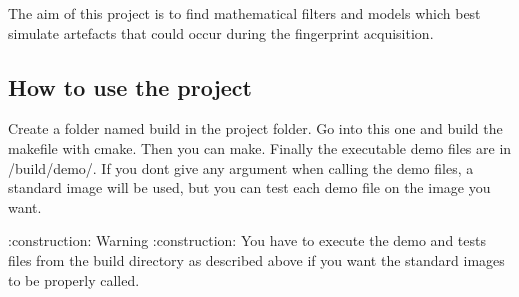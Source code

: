 The aim of this project is to find mathematical filters and models which best simulate artefacts that could occur during the fingerprint acquisition. \subsection*{How to use the project}

Create a folder named build in the project folder. Go into this one and build the makefile with cmake. Then you can make. Finally the executable demo files are in /build/demo/. If you don\textquotesingle{}t give any argument when calling the demo files, a standard image will be used, but you can test each demo file on the image you want.


 \+:construction\+: Warning \+:construction\+: You have to execute the demo and tests files from the build directory as described above if you want the standard images to be properly called. 